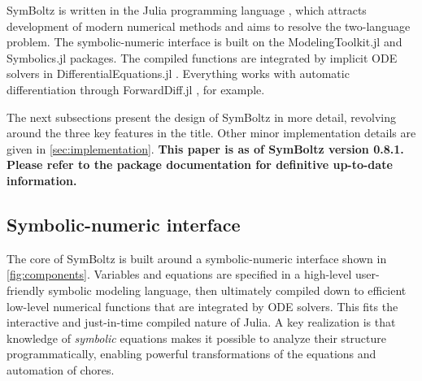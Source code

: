 \documentclass{aa}
\begin{document}
SymBoltz is written in the Julia programming language \citep{bezansonJuliaFreshApproach2017a}, which attracts development of modern numerical methods and aims to resolve the two-language problem.
The symbolic-numeric interface is built on the ModelingToolkit.jl \citep{maModelingToolkitComposableGraph2022} and Symbolics.jl \citep{gowdaHighperformanceSymbolicnumericsMultiple2022} packages.
The compiled functions are integrated by implicit ODE solvers in DifferentialEquations.jl \citep{rackauckasDifferentialEquationsjlPerformantFeatureRich2017}.
Everything works with automatic differentiation through ForwardDiff.jl \citep{revelsForwardModeAutomaticDifferentiation2016}, for example.

The next subsections present the design of SymBoltz in more detail, revolving around the three key features in the title.
Other minor implementation details are given in \cref{sec:implementation}.
\textbf{This paper is as of SymBoltz version 0.8.1. Please refer to the package documentation for definitive up-to-date information.}


\iffalse
One design is not necessarily better than the other.
Monolithic pros: freedom to do anything (e.g. approximations, switching, ...); 
Monolithic cons: does not scale well for many models, must navigate huge source code, not transparent; low level of abstraction; 
Modular pros: higher level of abstraction; unused components do not clutter; which equations are transparent to the user.
Modular cons: monolithic pros.
In my opinion, this makes CLASS good for a fine-tuned fiducial cosmology code,
while SymBoltz provides a platform that makes it easier to "explore" additional models (i.e. a "general purpose Boltzmann solver"),
in our opinion.
\fi

\subsection{Symbolic-numeric interface}
\label{sec:symbolicnumeric}

The core of SymBoltz is built around a symbolic-numeric interface shown in \cref{fig:components}.
Variables and equations are specified in a high-level user-friendly symbolic modeling language, then ultimately compiled down to efficient low-level numerical functions that are integrated by ODE solvers.
This fits the interactive and just-in-time compiled nature of Julia.
A key realization is that knowledge of \emph{symbolic} equations makes it possible to analyze their structure programmatically, enabling powerful transformations of the equations and automation of chores.
\end{document}
